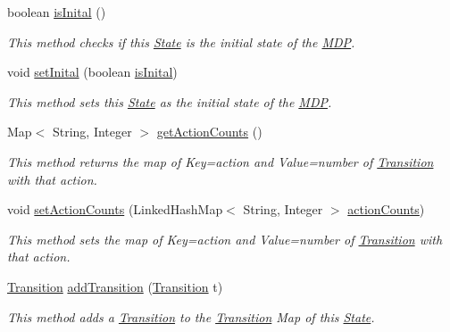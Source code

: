 \begin{DoxyCompactItemize}
boolean \hyperlink{classese_1_1seas_1_1upenn_1_1edu_1_1_state_a79165c8a0e7d44b24de8d7bfcf9946a7}{is\+Inital} ()
\begin{DoxyCompactList}\small\item\em This method checks if this \hyperlink{classese_1_1seas_1_1upenn_1_1edu_1_1_state}{State} is the initial state of the \hyperlink{classese_1_1seas_1_1upenn_1_1edu_1_1_m_d_p}{M\+D\+P}. \end{DoxyCompactList}\item 
void \hyperlink{classese_1_1seas_1_1upenn_1_1edu_1_1_state_a1d21608fbd6ac74fdc3c052b205d5a24}{set\+Inital} (boolean \hyperlink{classese_1_1seas_1_1upenn_1_1edu_1_1_state_aabc06e5afd914e3292820fd9fab31ceb}{is\+Inital})
\begin{DoxyCompactList}\small\item\em This method sets this \hyperlink{classese_1_1seas_1_1upenn_1_1edu_1_1_state}{State} as the initial state of the \hyperlink{classese_1_1seas_1_1upenn_1_1edu_1_1_m_d_p}{M\+D\+P}. \end{DoxyCompactList}\item 
Map$<$ String, Integer $>$ \hyperlink{classese_1_1seas_1_1upenn_1_1edu_1_1_state_a5cab4a963a7af4b95809de7fa106d02c}{get\+Action\+Counts} ()
\begin{DoxyCompactList}\small\item\em This method returns the map of Key=action and Value=number of \hyperlink{classese_1_1seas_1_1upenn_1_1edu_1_1_transition}{Transition} with that action. \end{DoxyCompactList}\item 
void \hyperlink{classese_1_1seas_1_1upenn_1_1edu_1_1_state_a6619cae7d9f2e5ce815f88d819d3eb84}{set\+Action\+Counts} (Linked\+Hash\+Map$<$ String, Integer $>$ \hyperlink{classese_1_1seas_1_1upenn_1_1edu_1_1_state_a75a043358cc508325468b834586638fc}{action\+Counts})
\begin{DoxyCompactList}\small\item\em This method sets the map of Key=action and Value=number of \hyperlink{classese_1_1seas_1_1upenn_1_1edu_1_1_transition}{Transition} with that action. \end{DoxyCompactList}\item 
\hyperlink{classese_1_1seas_1_1upenn_1_1edu_1_1_transition}{Transition} \hyperlink{classese_1_1seas_1_1upenn_1_1edu_1_1_state_a01295ee4b9e3b27146805b44349c482b}{add\+Transition} (\hyperlink{classese_1_1seas_1_1upenn_1_1edu_1_1_transition}{Transition} t)
\begin{DoxyCompactList}\small\item\em This method adds a \hyperlink{classese_1_1seas_1_1upenn_1_1edu_1_1_transition}{Transition} to the \hyperlink{classese_1_1seas_1_1upenn_1_1edu_1_1_transition}{Transition} Map of this \hyperlink{classese_1_1seas_1_1upenn_1_1edu_1_1_state}{State}. \end{DoxyCompactList}\item 

\end{DoxyCompactItemize}
